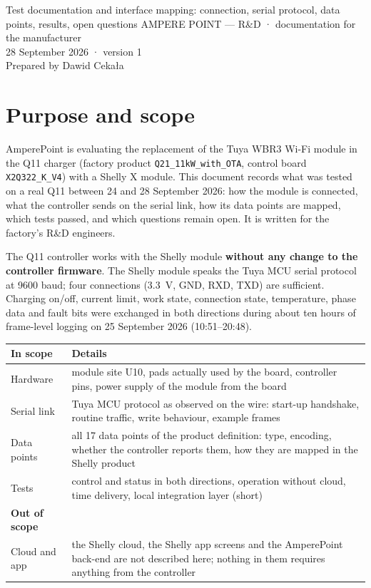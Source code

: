 \documentclass[11pt,a4paper]{article}
\begin{document}
%
{Test documentation and interface mapping: connection, serial protocol, data points, results, open questions}%
{AMPERE POINT — R\&D · documentation for the manufacturer\\28 September 2026 · version 1\\Prepared by Dawid Cekała}

\section{Purpose and scope}

AmperePoint is evaluating the replacement of the Tuya WBR3 Wi-Fi module in the Q11 charger (factory product \texttt{Q21\_11kW\_with\_OTA}, control board \texttt{X2Q322\_K\_V4}) with a Shelly X module. This document records what was tested on a real Q11 between 24 and 28 September 2026: how the module is connected, what the controller sends on the serial link, how its data points are mapped, which tests passed, and which questions remain open. It is written for the factory's R\&D engineers.

\begin{apgreenb}
The Q11 controller works with the Shelly module \textbf{without any change to the controller firmware}. The Shelly module speaks the Tuya MCU serial protocol at 9600 baud; four connections (3.3~V, GND, RXD, TXD) are sufficient. Charging on/off, current limit, work state, connection state, temperature, phase data and fault bits were exchanged in both directions during about ten hours of frame-level logging on 25 September 2026 (10:51--20:48).
\end{apgreenb}

\begin{longtable}{>{\raggedright\arraybackslash}p{3.2cm}>{\raggedright\arraybackslash}p{12.9cm}}
\toprule
\rowcolor{aphead}\textbf{In scope} & \textbf{Details} \\
\midrule\endhead
\bottomrule\endfoot
Hardware & module site U10, pads actually used by the board, controller pins, power supply of the module from the board \\
Serial link & Tuya MCU protocol as observed on the wire: start-up handshake, routine traffic, write behaviour, example frames \\
Data points & all 17 data points of the product definition: type, encoding, whether the controller reports them, how they are mapped in the Shelly product \\
Tests & control and status in both directions, operation without cloud, time delivery, local integration layer (short) \\
\rowcolor{aphead}\textbf{Out of scope} & \\
Cloud and app & the Shelly cloud, the Shelly app screens and the AmperePoint back-end are not described here; nothing in them requires anything from the controller \\
\end{longtable}
\end{document}
